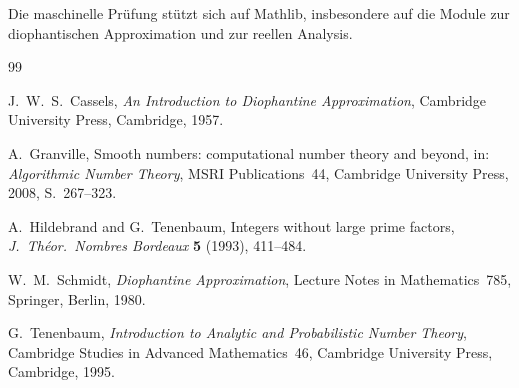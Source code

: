 \documentclass[11pt,a4paper]{article}
\theoremstyle{definition}
\begin{document}
	Die maschinelle Pr{\"u}fung st{\"u}tzt sich auf Mathlib, insbesondere auf die
	Module zur diophantischen Approximation und zur reellen Analysis.
	
	\begin{thebibliography}{99}
		
		J.~W.~S.~Cassels,
		\emph{An Introduction to Diophantine Approximation},
		Cambridge University Press, Cambridge, 1957.
		
		A.~Granville,
		Smooth numbers: computational number theory and beyond,
		in: \emph{Algorithmic Number Theory}, MSRI Publications~44,
		Cambridge University Press, 2008, S.~267--323.
		
		A.~Hildebrand and G.~Tenenbaum,
		Integers without large prime factors,
		\emph{J.\ Th{\'e}or.\ Nombres Bordeaux} \textbf{5} (1993), 411--484.
		
		W.~M.~Schmidt,
		\emph{Diophantine Approximation},
		Lecture Notes in Mathematics~785,
		Springer, Berlin, 1980.
		
		G.~Tenenbaum,
		\emph{Introduction to Analytic and Probabilistic Number Theory},
		Cambridge Studies in Advanced Mathematics~46,
		Cambridge University Press, Cambridge, 1995.
		
	\end{thebibliography}
	
\end{document}
